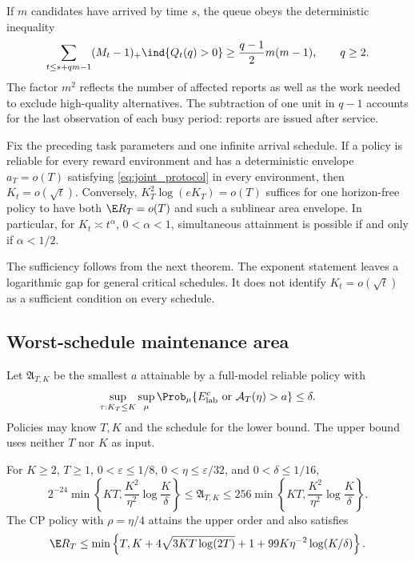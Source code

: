 If $m$ candidates have arrived by time $s$, the queue obeys the deterministic
inequality
\begin{equation}
 \sum_{t\le s+qm-1}(M_t-1)_+\ind\{Q_t(q)>0\}
                  \ge\frac{q-1}{2}m(m-1),\qquad q\ge2.
 \label{eq:queue_area}
\end{equation}
The factor $m^2$ reflects the number of affected reports as well as the work
needed to exclude high-quality alternatives. The subtraction of one unit in
$q-1$ accounts for the last observation of each busy period: reports are issued
after service.

\begin{corollary}
\label{cor:growth}
Fix the preceding task parameters and one infinite arrival schedule. If a
policy is reliable for every reward environment and has a deterministic
envelope $a_T=o(T)$ satisfying \eqref{eq:joint_protocol} in every environment,
then $K_t=o(\sqrt t)$. Conversely, $K_T^2\log(eK_T)=o(T)$ suffices for one
horizon-free policy to have both $\E R_T=o(T)$ and such a sublinear area
envelope. In particular, for $K_t\asymp t^\alpha$, $0<\alpha<1$, simultaneous
attainment is possible if and only if $\alpha<1/2$.
\end{corollary}

The sufficiency follows from the next theorem. The exponent statement leaves
a logarithmic gap for general critical schedules. It does not identify
$K_t=o(\sqrt t)$ as a sufficient condition on every schedule.

\subsection{Worst-schedule maintenance area}

Let $\mathfrak A_{T,K}$ be the smallest $a$ attainable by a full-model reliable
policy with
\[
 \sup_{\tau:K_T\le K}\sup_\mu
 \Prob_\mu\{E_{\rm lab}^c\ \text{or}\ \mathcal A_T(\eta)>a\}\le\delta.
\]
Policies may know $T,K$ and the schedule for the lower bound. The upper bound
uses neither $T$ nor $K$ as input.

\begin{theorem}
\label{thm:worst_area}
For $K\ge2$, $T\ge1$, $0<\varepsilon\le1/8$,
$0<\eta\le\varepsilon/32$, and $0<\delta\le1/16$,
\begin{equation}
 2^{-24}\min\left\{KT,\frac{K^2}{\eta^2}\log\frac K\delta\right\}
 \le\mathfrak A_{T,K}\le
 256\min\left\{KT,\frac{K^2}{\eta^2}\log\frac K\delta\right\}.
 \label{eq:worst_area}
\end{equation}
The CP policy with $\rho=\eta/4$ attains the upper order and also satisfies
\begin{equation}
 \E R_T\le\min\left\{T,K+4\sqrt{3KT\log(2T)}+1+
                         99K\eta^{-2}\log(K/\delta)\right\}.
 \label{eq:joint_general}
\end{equation}
\end{theorem}

